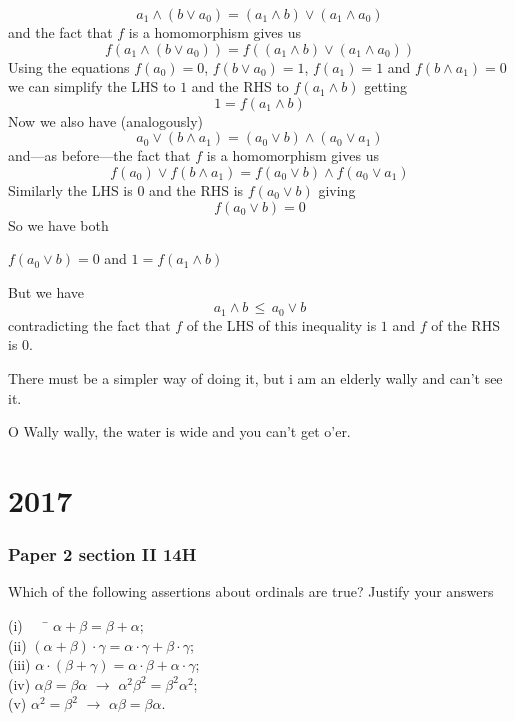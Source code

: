 \documentclass{book}
\begin{document}
$$a_1 \wedge (b\vee a_0) = (a_1 \wedge b) \vee (a_1 \wedge a_0)$$
and the fact that $f$ is a homomorphism gives us
$$f(a_1 \wedge (b\vee a_0)) = f((a_1 \wedge b) \vee (a_1 \wedge a_0))$$
Using the equations $f(a_0) = 0$, $f(b\vee a_0) = 1$, $f(a_1) = 1$
and $f(b\wedge a_1) = 0$ we can simplify the  LHS to $1$ and the RHS
to $f(a_1 \wedge b)$ getting
$$1 = f(a_1 \wedge b)$$
Now we also have (analogously)
 $$a_0 \vee (b \wedge a_1) = (a_0 \vee b) \wedge (a_0 \vee a_1)$$
and---as before---the fact that $f$ is a homomorphism gives us
 $$f(a_0) \vee f(b \wedge a_1) = f(a_0 \vee b) \wedge f(a_0 \vee a_1)$$
Similarly the LHS is $0$ and the RHS is $f(a_0 \vee b)$ giving
$$f(a_0 \vee b) = 0$$
So we have both
\begin{center}
$f(a_0 \vee b) = 0$ and $1 = f(a_1 \wedge b)$\end{center}
But we have $$a_1 \wedge b\, \leq\, a_0 \vee b$$
contradicting the fact that $f$ of the LHS of this inequality
is $1$ and $f$ of the RHS is $0$.

\medskip

There must be a simpler way of doing it, but i am an elderly
wally and can't see it.

O Wally wally, the water is wide
and you can't get o'er.



\chapter{2017}


\subsection*{Paper 2 section II 14H}


Which of the following assertions about ordinals are true?  Justify your answers

\begin{tabbing}
(i) \ \ \ \= $\alpha + \beta = \beta + \alpha$;\\

(ii)   \>$(\alpha + \beta)\cdot \gamma = \alpha \cdot \gamma + \beta \cdot \gamma$;\\

(iii)   \>$\alpha\cdot(\beta+\gamma) = \alpha \cdot \beta + \alpha \cdot \gamma$;\\

(iv)   \> $\alpha\beta = \beta\alpha$  $\to$  $\alpha^2\beta^2 = \beta^2\alpha^2$;\\

(v)      \> $\alpha^2 = \beta^2$  $\to$ $\alpha\beta = \beta\alpha$.

\end{tabbing}
\end{document}
